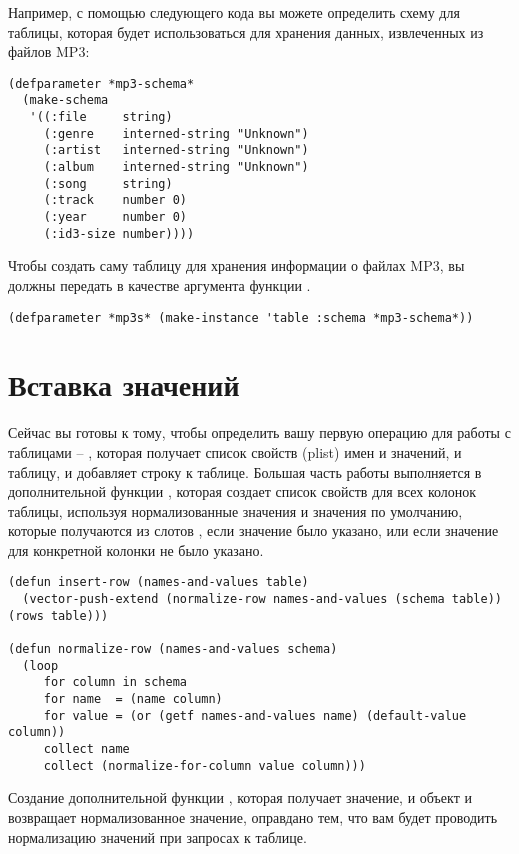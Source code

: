Например, с помощью следующего кода вы можете определить схему для таблицы, которая будет
использоваться для хранения данных, извлеченных из файлов MP3:

\begin{lstlisting}
(defparameter *mp3-schema* 
  (make-schema 
   '((:file     string)
     (:genre    interned-string "Unknown")
     (:artist   interned-string "Unknown")
     (:album    interned-string "Unknown")
     (:song     string)
     (:track    number 0)
     (:year     number 0)
     (:id3-size number))))
\end{lstlisting}

Чтобы создать саму таблицу для хранения информации о файлах MP3, вы должны передать
 в качестве аргумента  функции .

\begin{lstlisting}
(defparameter *mp3s* (make-instance 'table :schema *mp3-schema*))
\end{lstlisting}

\section{Вставка значений}

Сейчас вы готовы к тому, чтобы определить вашу первую операцию для работы с таблицами --
, которая получает список свойств (plist) имен и значений, и таблицу, и
добавляет строку к таблице.  Большая часть работы выполняется в дополнительной функции
, которая создает список свойств для всех колонок таблицы, используя
нормализованные значения и значения по умолчанию, которые получаются из слотов
, если значение было указано, или  если
значение для конкретной колонки не было указано.

\begin{lstlisting}
(defun insert-row (names-and-values table)
  (vector-push-extend (normalize-row names-and-values (schema table)) (rows table)))

(defun normalize-row (names-and-values schema)
  (loop
     for column in schema
     for name  = (name column)
     for value = (or (getf names-and-values name) (default-value column))
     collect name
     collect (normalize-for-column value column)))
\end{lstlisting}

Создание дополнительной функции , которая получает значение, и
объект  и возвращает нормализованное значение, оправдано тем, что вам будет
проводить нормализацию значений при запросах к таблице.


